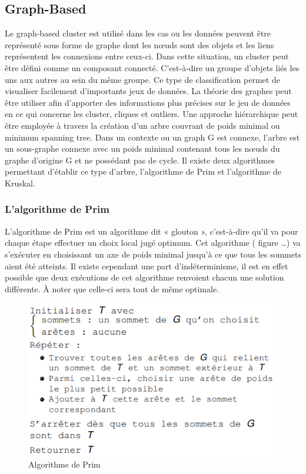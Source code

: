 \documentclass[memoire.tex]{subfiles}
\begin{document}
\subsection{Graph-Based}
Le graph-based cluster est utilisé dans les cas ou les données peuvent être représenté sous forme de graphe dont les nœuds sont des objets et les liens représentent les connexions entre ceux-ci. Dans cette situation, un cluster peut être défini comme un composant connecté.  C'est-à-dire un groupe d'objets liés les uns aux autres au sein du même groupe. Ce type de classification permet de visualiser facilement d'importants jeux de données.
La théorie des graphes peut être utiliser afin d’apporter des informations plus précises sur le jeu de données en ce qui concerne les cluster, cliques et outliers. Une approche hiérarchique peut être employée à travers la création d’un arbre couvrant de poids minimal ou minimum spanning tree. Dans un contexte ou un graph G est connexe, l’arbre est un sous-graphe connexe avec un poids minimal contenant tous les nœuds du graphe d’origine G et ne possédant pas de cycle. Il existe deux algorithmes permettant d’établir ce type d’arbre, l’algorithme de Prim et l’algorithme de Kruskal.
\subsubsection{L'algorithme de Prim}
L’algorithme de Prim est un algorithme dit « glouton », c'est-à-dire qu’il va pour chaque étape effectuer un choix local jugé optimum. Cet algorithme ( figure …) va s’exécuter en choisissant un axe de poids minimal jusqu’à ce que tous les sommets aient été atteints. Il existe cependant une part d'indéterminisme, il est en effet possible que deux exécutions de cet algorithme renvoient chacun une solution différente. À noter que celle-ci sera tout de même optimale.
	\begin{figure}[h!]
		\centerline{\includegraphics[scale=0.8]{img/prim.png}}
		\caption{Algorithme de Prim}
	\end{figure}
\newpage
\end{document}
